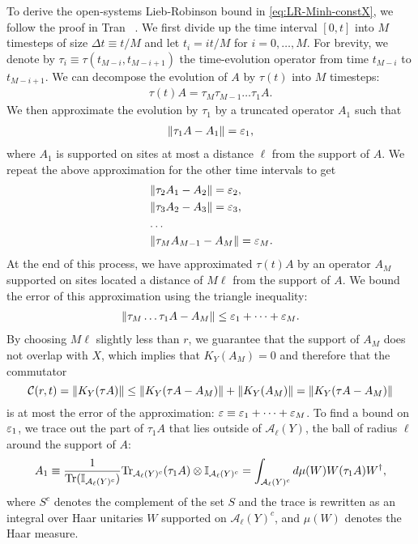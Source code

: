 To derive the open-systems Lieb-Robinson bound in \cref{eq:LR-Minh-constX}, we follow the proof in Tran \etal~\cite{Tran2019b}.
We first divide up the time interval $[0,t]$ into $M$ timesteps of size $\Delta t \equiv t/M$ and let $t_i = it/M$ for $i=0,\dots,M$.
For brevity, we denote by $\tau_i \equiv \tau(t_{M-i},t_{M-i+1})$ the time-evolution operator from time $t_{M-i}$ to $t_{M-i+1}$.
We can decompose the evolution of $A$ by $\tau(t)$ into $M$ timesteps:
\begin{align}
  \tau(t)A = \tau_M \tau_{M-1}\dots \tau_1 A.
\end{align}
We then approximate the evolution by $\tau_1$ by a truncated operator $A_1$ such that
\begin{align}
  \left\|\tau_1 A - A_1\right\| = \varepsilon_1,
\end{align}
where $A_1$ is supported on sites at most a distance $\ell$ from the support of $A$.
We repeat the above approximation for the other time intervals to get
\begin{align}
  &\left\|\tau_2 A_1 - A_2\right\| = \varepsilon_2,\\
  &\left\|\tau_3 A_2 - A_3\right\| = \varepsilon_3,\\
   &\dots \nonumber\\
  &\left\|\tau_M A_{M-1} - A_M\right\| = \varepsilon_M.
\end{align}
At the end of this process, we have approximated $\tau(t)A$ by an operator $A_M$ supported on sites located a distance of $M\ell$ from the support of $A$.
We bound the error of this approximation using the triangle inequality:
\begin{align}
  \left\|\tau_M\dots\tau_1 A - A_M\right\| \le \varepsilon_1 + \dots + \varepsilon_M.
\end{align}
By choosing $M\ell$ slightly less than $r$, we guarantee that the support of $A_M$ does not overlap with $X$, which implies that $K_Y(A_M) = 0$ and therefore that the commutator
\begin{equation}
	\mathcal C(r,t) =  \left\|  K_Y(\tau A)\right\| \leq \left\|  K_Y(\tau A-A_M)\right\| + \left\|  K_Y(A_M)\right\| = \left\|  K_Y(\tau A-A_M)\right\|
\end{equation} is at most the error of the approximation: $\varepsilon \equiv \varepsilon_1 + \dots +\varepsilon_M$.
To find a bound on $\varepsilon_1$, we trace out the part of $\tau_1 A$ that lies outside of $\mathcal A_\ell(Y)$, the ball of radius $\ell$ around the support of $A$:
\begin{align}
  A_1 \equiv \frac{1}{\mathrm{Tr}(\mathbb I_{\mathcal A_\ell(Y)^c})} \mathrm{Tr}_{\mathcal A_\ell(Y)^c} (\tau_1 A) \otimes \mathbb I_{\mathcal A_\ell(Y)^c}
     = \int_{\mathcal A_\ell(Y)^c} d\mu(W) W (\tau_1 A) W^\dag,\label{eq:traceint}
\end{align}
where $S^c$ denotes the complement of the set $S$ and the trace is rewritten as an integral over Haar unitaries $W$ supported on $\mathcal A_\ell(Y)^c$, and $\mu(W)$ denotes the Haar measure.

